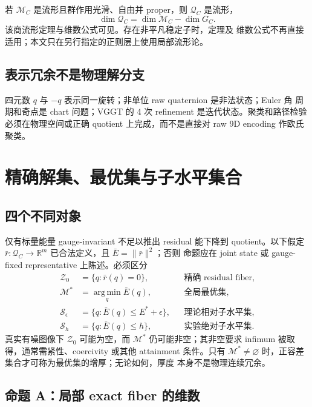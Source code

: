 \documentclass[UTF8,a4paper,11pt]{ctexart}
\newcommand{\Sset}{\mathcal S}
\newcommand{\Mspace}{\mathcal M}
\newcommand{\Qspace}{\mathcal Q}
\newcommand{\argmin}{\operatorname*{arg\,min}}
\begin{document}
若 $\Mspace_C$ 是流形且群作用光滑、自由并 proper，则 $\Qspace_C$ 是流形，
\begin{equation}
  \dim\Qspace_C=\dim\Mspace_C-\dim G_C.
\end{equation}
该商流形定理与维数公式可见\citet{lee2013smooth}。存在非平凡稳定子时，定理及
维数公式不再直接适用；本文只在另行指定的正则层上使用局部流形论。

\subsection{表示冗余不是物理解分支}

四元数 $q$ 与 $-q$ 表示同一旋转；非单位 raw quaternion 是非法状态；Euler 角
周期和奇点是 chart 问题；VGGT 的 4 次 refinement 是迭代状态。聚类和路径检验
必须在物理空间或正确 quotient 上完成，而不是直接对 raw 9D encoding 作欧氏聚类。

\section{精确解集、最优集与子水平集合}

\subsection{四个不同对象}

仅有标量能量 gauge-invariant 不足以推出 residual 能下降到 quotient。以下假定
$\bar r:\Qspace_C\to\mathbb R^m$ 已合法定义，且 $\bar E=\|\bar r\|^2$；否则
命题应在 joint state 或 gauge-fixed representative 上陈述。必须区分
\begin{align}
  \mathcal Z_0 &= \{q:\bar r(q)=0\}, &&\text{精确 residual fiber},\\
  \Mspace^* &= \argmin_q\bar E(q), &&\text{全局最优集},\\
  \Sset_\epsilon &= \{q:\bar E(q)\le E^*+\epsilon\},
    &&\text{理论相对子水平集},\\
  \Sset_h &= \{q:\bar E(q)\le h\},
    &&\text{实验绝对子水平集}.
\end{align}
真实有噪图像下 $\mathcal Z_0$ 可能为空，而 $\Mspace^*$ 仍可能非空；其非空要求
infimum 被取得，通常需紧性、coercivity 或其他 attainment 条件。只有
$\Mspace^*\ne\varnothing$ 时，正容差集合才可称为最优集的增厚；无论如何，厚度
本身不是物理连续冗余。

\subsection{命题 A：局部 exact fiber 的维数}
\end{document}
